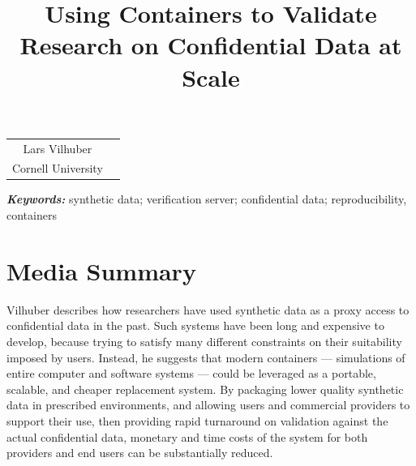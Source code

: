 \documentclass[inline]{hdsr}
\begin{document}




\begin{center}

  \title{Using Containers to Validate Research on Confidential Data at Scale}
  \maketitle

  \thispagestyle{empty}
  
  \vspace*{.2in}

  \begin{tabular}{cc}
    Lars Vilhuber\upstairs{\affilone,*}
   \\[0.25ex]
   {\small \upstairs{\affilone} Cornell University} \\
  \end{tabular}
  
  \vspace*{0.4in}

\begin{abstract}

\end{abstract}
\end{center}

\vspace*{0.15in}
\hspace{10pt}
  \small	
  \textbf{\textit{Keywords: }} {synthetic data; verification server; confidential data; reproducibility, containers}
  
\copyrightnotice

\section*{Media Summary}
Vilhuber describes how researchers have used synthetic data as a proxy access to confidential data in the past. Such systems have been long and expensive to develop, because trying to satisfy many different constraints on their suitability imposed by users. Instead, he suggests that modern containers --- simulations of entire computer and software systems --- could be leveraged as a portable, scalable, and cheaper replacement system. By packaging lower quality synthetic data in prescribed environments, and allowing users and commercial providers to support their use, then providing rapid turnaround on validation against the actual confidential data, monetary and time costs of the system for both providers and end users can be substantially reduced. 
\end{document}
